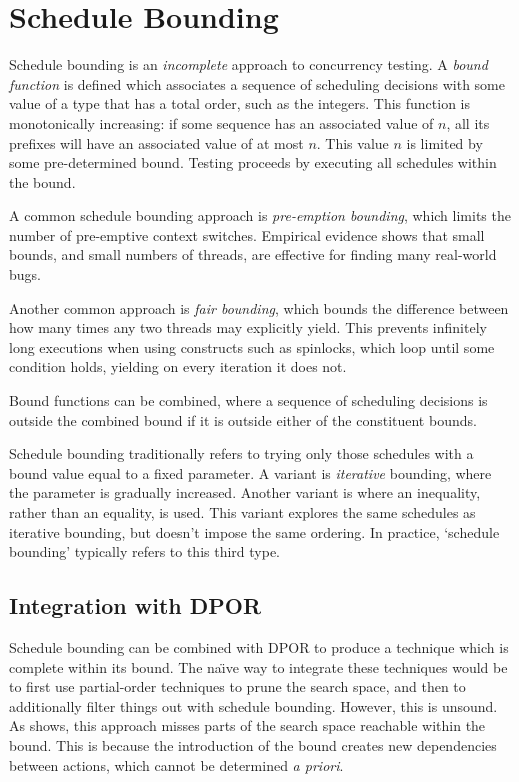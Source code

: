 \section{Schedule Bounding}
\label{sec:sct-bounding}

Schedule bounding\cite{emmi2011,musuvathi2008,musuvathi2007} is an
\emph{incomplete} approach to concurrency testing.  A \emph{bound function} is
defined which associates a sequence of scheduling decisions with some value of a
type that has a total order, such as the integers.  This function is
monotonically increasing: if some sequence has an associated value of $n$, all
its prefixes will have an associated value of at most $n$.  This value $n$ is
limited by some pre-determined bound.  Testing proceeds by executing all
schedules within the bound.

A common schedule bounding approach is \emph{pre-emption
  bounding}\cite{musuvathi2007}, which limits the number of
pre-emptive context switches.  Empirical evidence shows that small
bounds, and small numbers of threads, are effective for finding many
real-world bugs\cite{thomson2014}.

Another common approach is \emph{fair bounding}\cite{musuvathi2008},
which bounds the difference between how many times any two threads may
explicitly yield.  This prevents infinitely long executions when using
constructs such as spinlocks, which loop until some condition holds,
yielding on every iteration it does not.

Bound functions can be combined, where a sequence of scheduling
decisions is outside the combined bound if it is outside either of the
constituent bounds.

Schedule bounding traditionally refers to trying only those schedules
with a bound value equal to a fixed parameter.  A variant is
\emph{iterative} bounding, where the parameter is gradually
increased\cite{musuvathi2007}.  Another variant is where an
inequality, rather than an equality, is used.  This variant explores
the same schedules as iterative bounding, but doesn't impose the same
ordering.  In practice, `schedule bounding' typically refers to this
third type.

\subsection{Integration with DPOR}

Schedule bounding can be combined with DPOR to produce a technique
which is complete within its bound.  The na\"{\i}ve way to integrate
these techniques would be to first use partial-order techniques to
prune the search space, and then to additionally filter things out
with schedule bounding.  However, this is unsound.  As
 shows, this approach misses parts of the
search space reachable within the bound.  This is because the
introduction of the bound creates new dependencies between actions,
which cannot be determined \emph{a priori}\cite{coons2013}.

